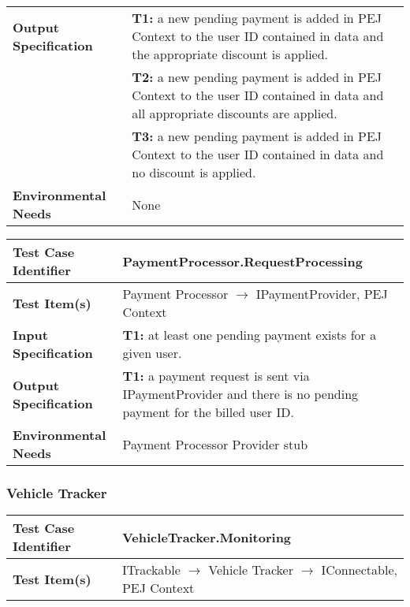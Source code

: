 {\begin{tabularx}{\textwidth}{l X}
    \textbf{Output Specification} & \textbf{T1:} a new pending payment is added in PEJ Context to the user ID contained in data and the appropriate discount is applied.\\
    & \textbf{T2:} a new pending payment is added in PEJ Context to the user ID contained in data and all appropriate discounts are applied.\\
    & \textbf{T3:} a new pending payment is added in PEJ Context to the user ID contained in data and no discount is applied.\\
    \hline 
    
    \textbf{Environmental Needs} & None\\
    \hline
\end{tabularx}
\bigskip 

\noindent
\begin{tabularx}{\textwidth}{l X}
    \hline 
    \textbf{Test Case Identifier} & PaymentProcessor.RequestProcessing\\ 
    \hline 
    
    \textbf{Test Item(s)} & Payment Processor $\rightarrow$ IPaymentProvider, PEJ Context\\
    \hline 
    
    \textbf{Input Specification} & \textbf{T1:} at least one pending payment exists for a given user.\\
    \hline 
    
    \textbf{Output Specification} & \textbf{T1:} a payment request is sent via IPaymentProvider and there is no pending payment for the billed user ID.\\
    \hline 
    
    \textbf{Environmental Needs} & Payment Processor Provider stub\\
    \hline
\end{tabularx}

\noindent 
\subsubsection{Vehicle Tracker}
\begin{tabularx}{\textwidth}{l X}
    \hline 
    \textbf{Test Case Identifier} & VehicleTracker.Monitoring\\ 
    \hline 
    
    \textbf{Test Item(s)} & ITrackable $\rightarrow$ Vehicle Tracker $\rightarrow$ IConnectable, PEJ Context\\
    \hline 
    

\end{tabularx}}
